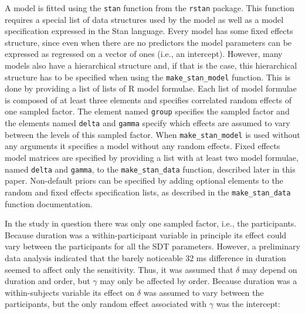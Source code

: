\documentclass[oneside,a4paper]{article}
\begin{document}
A model is fitted using the \texttt{stan} function from the
\texttt{rstan} package. This function requires a special list of data
structures used by the model as well as a model specification
expressed in the Stan language. Every model has some fixed effects
structure, since even when there are no predictors the model
parameters can be expressed as regressed on a vector of ones (i.e., an
intercept). However, many models also have a hierarchical structure
and, if that is the case, this hierarchical structure has to be
specified when using the \texttt{make\_stan\_model} function. This is
done by providing a list of lists of R model formulae. Each list of
model formulae is composed of at least three elements and specifies
correlated random effects of one sampled factor. The element named
\texttt{group} specifies the sampled factor and the elements named
\texttt{delta} and \texttt{gamma} specify which effects are assumed to
vary between the levels of this sampled factor. When
\texttt{make\_stan\_model} is used without any arguments it specifies
a model without any random effects. Fixed effects model matrices are
specified by providing a list with at least two model formulae, named
\texttt{delta} and \texttt{gamma}, to the \texttt{make\_stan\_data}
function, described later in this paper. Non-default priors can be
specified by adding optional elements to the random and fixed effects
specification lists, as described in the \texttt{make\_stan\_data}
function documentation.

In the study in question there was only one sampled factor, i.e., the
participants. Because duration was a within-participant variable in
principle its effect could vary between the participants for all the
SDT parameters. However, a preliminary data analysis indicated that
the barely noticeable 32 ms difference in duration seemed to affect
only the sensitivity. Thus, it was assumed that $\delta$ may depend on
duration and order, but $\gamma$ may only be affected by
order. Because duration was a within-subjects variable its effect on
$\delta$ was assumed to vary between the participants, but the only
random effect associated with $\gamma$ was the intercept:
\end{document}
